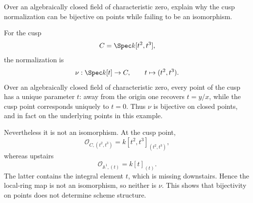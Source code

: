 \begin{problem}\label{prob:vi28-16}
Over an algebraically closed field of characteristic zero, explain why the cusp normalization can be bijective on points while failing to be an isomorphism.

\end{problem}

\ifdefined\FullProblemDossiers
\begin{solution}
For the cusp
\[
C=\Spec k[t^2,t^3],
\]
the normalization is
\[
\nu:\Spec k[t]\to C,\qquad t\mapsto(t^2,t^3).
\]
Over an algebraically closed field of characteristic zero, every point of the cusp has a unique parameter \(t\): away from the origin one recovers \(t=y/x\), while the cusp point corresponds uniquely to \(t=0\). Thus \(\nu\) is bijective on closed points, and in fact on the underlying points in this example.

Nevertheless it is not an isomorphism. At the cusp point,
\[
\mathcal O_{C,(t^2,t^3)}
=
k[t^2,t^3]_{(t^2,t^3)},
\]
whereas upstairs
\[
\mathcal O_{\mathbb A^1,(t)}
=
k[t]_{(t)}.
\]
The latter contains the integral element \(t\), which is missing downstairs. Hence the local-ring map is not an isomorphism, so neither is \(\nu\). This shows that bijectivity on points does not determine scheme structure.
\end{solution}
\fi
